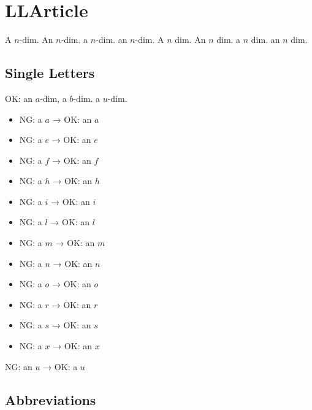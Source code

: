 \section{LLArticle}

A $n$-dim. An $n$-dim. a $n$-dim. an $n$-dim.
A \(n\) dim. An \(n\) dim. a \(n\) dim. an \(n\) dim.

\subsection{Single Letters}

OK: an $a$-dim, a $b$-dim. a $u$-dim.

\vspace{0.5em}
\begin{minipage}{0.5\textwidth}
	\begin{itemize}
		\item NG: a $a$ → OK: an $a$
		\item NG: a $e$ → OK: an $e$
		\item NG: a $f$ → OK: an $f$
		\item NG: a $h$ → OK: an $h$
		\item NG: a $i$ → OK: an $i$
		\item NG: a $l$ → OK: an $l$
	\end{itemize}
\end{minipage}
\begin{minipage}{0.5\textwidth}
	\begin{itemize}
		\item NG: a $m$ → OK: an $m$
		\item NG: a $n$ → OK: an $n$
		\item NG: a $o$ → OK: an $o$
		\item NG: a $r$ → OK: an $r$
		\item NG: a $s$ → OK: an $s$
		\item NG: a $x$ → OK: an $x$
	\end{itemize}
\end{minipage}
\vspace{0.5em}

NG: an \(u\) → OK: a \(u\)

\subsection{Abbreviations}

